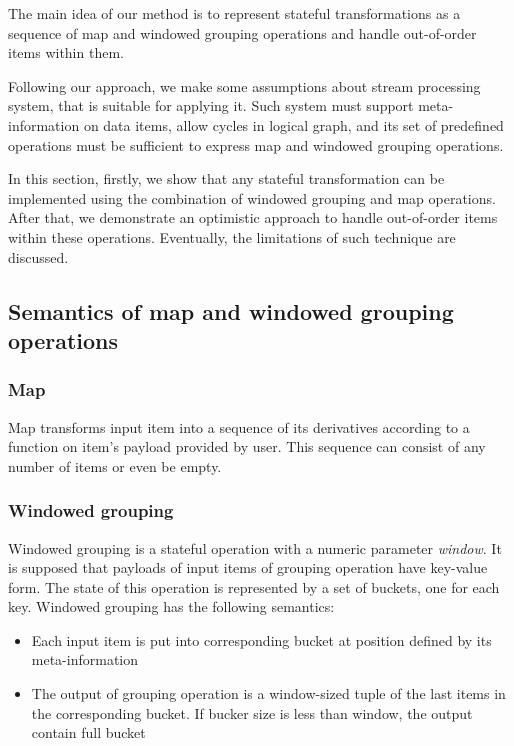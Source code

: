 
\label {fs-optimistic}

The main idea of our method is to represent stateful transformations as a sequence of map and windowed grouping operations and handle out-of-order items within them. 

Following our approach, we make some assumptions about stream processing system, that is suitable for applying it. Such system must support meta-information on data items, allow cycles in logical graph, and its set of predefined operations must be sufficient to express map and windowed grouping operations.

In this section, firstly, we show that any stateful transformation can be implemented using the combination of windowed grouping and map operations. After that, we demonstrate an optimistic approach to handle out-of-order items within these operations. Eventually, the limitations of such technique are discussed.

\subsection{Semantics of map and windowed grouping operations}

\subsubsection{Map}
Map transforms input item into a sequence of its derivatives according to a function on item's payload provided by user. This sequence can consist of any number of items or even be empty.

\subsubsection{Windowed grouping}
Windowed grouping is a stateful operation with a numeric parameter {\it window}. It is supposed that payloads of input items of grouping operation have key-value form. The state of this operation is represented by a set of buckets, one for each key. Windowed grouping has the following semantics:

\begin{itemize}
    \item Each input item is put into corresponding bucket at position defined by its meta-information
    \item The output of grouping operation is a window-sized tuple of the last items in the corresponding bucket. If bucker size is less than window, the output contain full bucket
\end{itemize}

